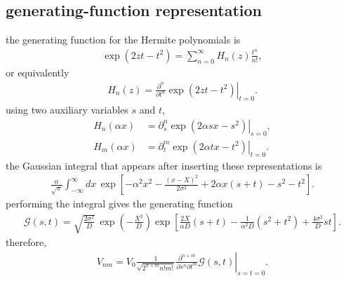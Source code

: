 \subsection{generating-function representation}
the generating function for the Hermite polynomials is
\begin{align}
    \exp(2zt-t^2)
    =
    \sum_{n=0}^{\infty}H_n(z)\frac{t^n}{n!},
\end{align}
or equivalently
\begin{align}
    H_n(z)
    =
    \left.
    \frac{\partial^n}{\partial t^n}
    \exp(2zt-t^2)
    \right|_{t=0}.
\end{align}
using two auxiliary variables $s$ and $t$,
\begin{align}
    H_n(\alpha x)
     & =
    \left.
    \partial_s^n
    \exp\left({2\alpha sx}-s^2\right)
    \right|_{s=0}, \\
    H_m(\alpha x)
     & =
    \left.
    \partial_t^m
    \exp\left(2\alpha tx-t^2\right)
    \right|_{t=0}.
\end{align}
the Gaussian integral that appears after inserting these representations is
\begin{align}
    \frac{\alpha}{\sqrt{\pi}}
    \int_{-\infty}^{\infty}dx\,
    \exp\left[
    -{\alpha^2 x^2}
    -\frac{(x-X)^2}{2\sigma^2}
    +2\alpha x(s+t)
    -s^2-t^2
    \right].
\end{align}
performing the integral gives the generating function
\begin{align}
    \boxed{
        \mathcal G(s,t)
        =
        \sqrt{\frac{2\sigma^2}{D}}\,
        \exp\left(-\frac{X^2}{D}\right)
        \exp\left[
            \frac{2X}{\alpha D}(s+t)
            -\frac{1}{\alpha^2D}(s^2+t^2)
            +\frac{4\sigma^2}{D}st
            \right].
    }
\end{align}
therefore,
\begin{align}
    \boxed{
        V_{nm}
        =
        V_0  \frac{1}{\sqrt{2^{n+m}n!m!}}
        \left.
        \frac{\partial^{n+m}}
        {\partial s^n\partial t^m}
        \mathcal G(s,t)
        \right|_{s=t=0}.
    }
\end{align}

